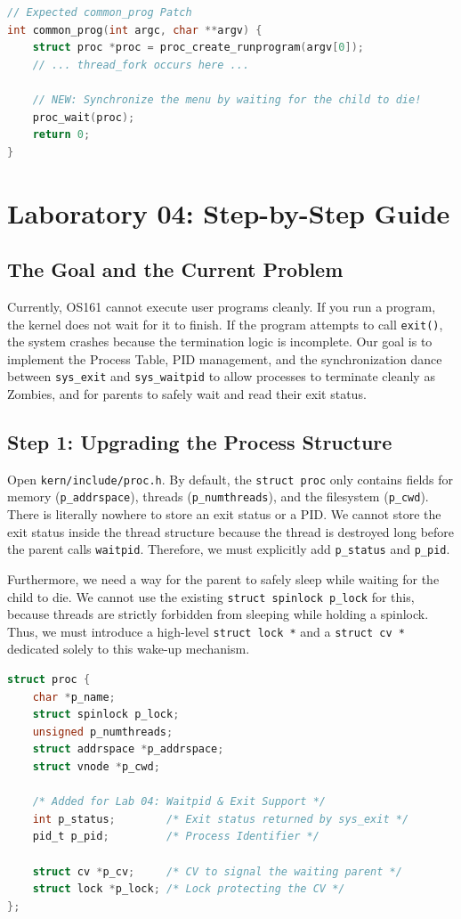 \begin{lstlisting}[language=C]
// Expected common_prog Patch
int common_prog(int argc, char **argv) {
    struct proc *proc = proc_create_runprogram(argv[0]);
    // ... thread_fork occurs here ...
    
    // NEW: Synchronize the menu by waiting for the child to die!
    proc_wait(proc); 
    return 0;
}
\end{lstlisting}

\newpage
\section{Laboratory 04: Step-by-Step Guide}


\subsection{The Goal and the Current Problem}
Currently, OS161 cannot execute user programs cleanly. If you run a program, the kernel does not wait for it to finish. If the program attempts to call \texttt{exit()}, the system crashes because the termination logic is incomplete. 
Our goal is to implement the Process Table, PID management, and the synchronization dance between \texttt{sys\_exit} and \texttt{sys\_waitpid} to allow processes to terminate cleanly as Zombies, and for parents to safely wait and read their exit status.

\subsection{Step 1: Upgrading the Process Structure}
Open \texttt{kern/include/proc.h}. By default, the \texttt{struct proc} only contains fields for memory (\texttt{p\_addrspace}), threads (\texttt{p\_numthreads}), and the filesystem (\texttt{p\_cwd}). There is literally nowhere to store an exit status or a PID. We cannot store the exit status inside the thread structure because the thread is destroyed long before the parent calls \texttt{waitpid}. Therefore, we must explicitly add \texttt{p\_status} and \texttt{p\_pid}. 

Furthermore, we need a way for the parent to safely sleep while waiting for the child to die. We cannot use the existing \texttt{struct spinlock p\_lock} for this, because threads are strictly forbidden from sleeping while holding a spinlock. Thus, we must introduce a high-level \texttt{struct lock *} and a \texttt{struct cv *} dedicated solely to this wake-up mechanism.
\begin{lstlisting}[language=C]
struct proc {
    char *p_name;
    struct spinlock p_lock;
    unsigned p_numthreads;
    struct addrspace *p_addrspace;
    struct vnode *p_cwd;

    /* Added for Lab 04: Waitpid & Exit Support */
    int p_status;        /* Exit status returned by sys_exit */
    pid_t p_pid;         /* Process Identifier */
    
    struct cv *p_cv;     /* CV to signal the waiting parent */
    struct lock *p_lock; /* Lock protecting the CV */
};
\end{lstlisting}

